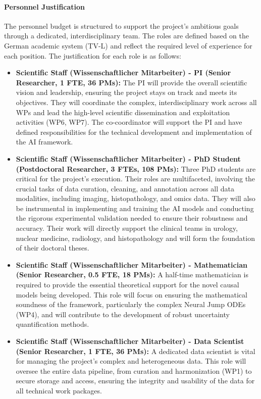 \documentclass[11pt, a4paper]{article}
\begin{document}
\paragraph{Personnel Justification}
The personnel budget is structured to support the project's ambitious goals through a dedicated, interdisciplinary team. The roles are defined based on the German academic system (TV-L) and reflect the required level of experience for each position. The justification for each role is as follows:
\begin{itemize}
    \item \textbf{Scientific Staff (Wissenschaftlicher Mitarbeiter) - PI (Senior Researcher, 1 FTE, 36 PMs):} The PI will provide the overall scientific vision and leadership, ensuring the project stays on track and meets its objectives. They will coordinate the complex, interdisciplinary work across all WPs and lead the high-level scientific dissemination and exploitation activities (WP6, WP7). The co-coordinator will support the PI and have defined responsibilities for the technical development and implementation of the AI framework.
    \item \textbf{Scientific Staff (Wissenschaftlicher Mitarbeiter) - PhD Student (Postdoctoral Researcher, 3 FTEs, 108 PMs):} Three PhD students are critical for the project's execution. Their roles are multifaceted, involving the crucial tasks of data curation, cleaning, and annotation across all data modalities, including imaging, histopathology, and omics data. They will also be instrumental in implementing and training the AI models and conducting the rigorous experimental validation needed to ensure their robustness and accuracy. Their work will directly support the clinical teams in urology, nuclear medicine, radiology, and histopathology and will form the foundation of their doctoral theses.
    \item \textbf{Scientific Staff (Wissenschaftlicher Mitarbeiter) - Mathematician (Senior Researcher, 0.5 FTE, 18 PMs):} A half-time mathematician is required to provide the essential theoretical support for the novel causal models being developed. This role will focus on ensuring the mathematical soundness of the framework, particularly the complex Neural Jump ODEs (WP4), and will contribute to the development of robust uncertainty quantification methods.
    \item \textbf{Scientific Staff (Wissenschaftlicher Mitarbeiter) - Data Scientist (Senior Researcher, 1 FTE, 36 PMs):} A dedicated data scientist is vital for managing the project's complex and heterogeneous data. This role will oversee the entire data pipeline, from curation and harmonization (WP1) to secure storage and access, ensuring the integrity and usability of the data for all technical work packages.

\end{itemize}
\end{document}
